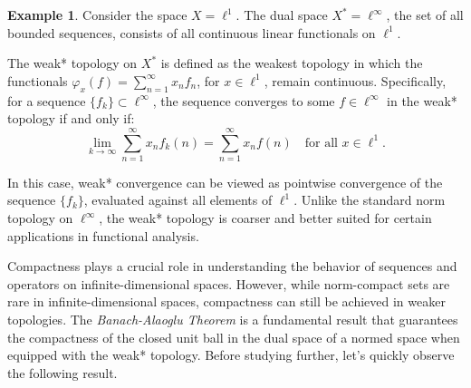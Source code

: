 \documentclass[12pt, reqno]{amsart}
\theoremstyle{definition}
\newtheorem{example}[theorem]{Example}
\numberwithin{equation}{section}
\begin{document}
\begin{example}
    Consider the space \( X = \ell^1 \). The dual space \( X^* = \ell^\infty \), the set of all bounded sequences, consists of all continuous linear functionals on \( \ell^1 \). 

    The weak* topology on \( X^* \) is defined as the weakest topology in which the functionals \( \varphi_x(f) = \sum_{n=1}^\infty x_n f_n \), for \( x \in \ell^1 \), remain continuous. Specifically, for a sequence \( \{f_k\} \subset \ell^\infty \), the sequence converges to some \( f \in \ell^\infty \) in the weak* topology if and only if:
    $$
    \lim_{k \to \infty} \sum_{n=1}^\infty x_n f_k(n) = \sum_{n=1}^\infty x_n f(n) \quad \text{for all } x \in \ell^1.
    $$

    In this case, weak* convergence can be viewed as pointwise convergence of the sequence \( \{f_k\} \), evaluated against all elements of \( \ell^1 \). Unlike the standard norm topology on \( \ell^\infty \), the weak* topology is coarser and better suited for certain applications in functional analysis.
\end{example}

Compactness plays a crucial role in understanding the behavior of sequences and operators on infinite-dimensional spaces. However, while norm-compact sets are rare in infinite-dimensional spaces, compactness can still be achieved in weaker topologies. The \textit{Banach-Alaoglu Theorem} is a fundamental result that guarantees the compactness of the closed unit ball in the dual space of a normed space when equipped with the weak* topology. Before studying further, let's quickly observe the following result.
\end{document}

